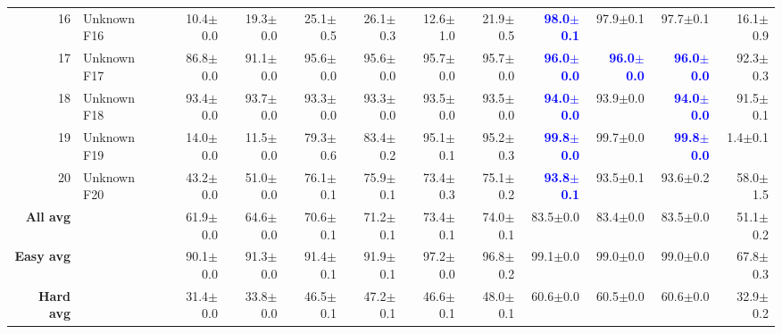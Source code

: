\begin{table}[t]
\begin{tabular}{r l  r r r r r r r r r r}
\rowcolor{gray!15}16 & Unknown F16 & 10.4$\pm$0.0 & 19.3$\pm$0.0 & 25.1$\pm$0.5 & 26.1$\pm$0.3 & 12.6$\pm$1.0 & 21.9$\pm$0.5 & \textcolor{blue}{\textbf{98.0$\pm$0.1}} & 97.9$\pm$0.1 & 97.7$\pm$0.1 & 16.1$\pm$0.9 \\
\rowcolor{gray!15}17 & Unknown F17 & 86.8$\pm$0.0 & 91.1$\pm$0.0 & 95.6$\pm$0.0 & 95.6$\pm$0.0 & 95.7$\pm$0.0 & 95.7$\pm$0.0 & \textcolor{blue}{\textbf{96.0$\pm$0.0}} & \textcolor{blue}{\textbf{96.0$\pm$0.0}} & \textcolor{blue}{\textbf{96.0$\pm$0.0}} & 92.3$\pm$0.3 \\
\rowcolor{gray!15}18 & Unknown F18 & 93.4$\pm$0.0 & 93.7$\pm$0.0 & 93.3$\pm$0.0 & 93.3$\pm$0.0 & 93.5$\pm$0.0 & 93.5$\pm$0.0 & \textcolor{blue}{\textbf{94.0$\pm$0.0}} & 93.9$\pm$0.0 & \textcolor{blue}{\textbf{94.0$\pm$0.0}} & 91.5$\pm$0.1 \\
\rowcolor{gray!15}19 & Unknown F19 & 14.0$\pm$0.0 & 11.5$\pm$0.0 & 79.3$\pm$0.6 & 83.4$\pm$0.2 & 95.1$\pm$0.1 & 95.2$\pm$0.3 & \textcolor{blue}{\textbf{99.8$\pm$0.0}} & 99.7$\pm$0.0 & \textcolor{blue}{\textbf{99.8$\pm$0.0}} & 1.4$\pm$0.1 \\
\rowcolor{gray!15}20 & Unknown F20 & 43.2$\pm$0.0 & 51.0$\pm$0.0 & 76.1$\pm$0.1 & 75.9$\pm$0.1 & 73.4$\pm$0.3 & 75.1$\pm$0.2 & \textcolor{blue}{\textbf{93.8$\pm$0.1}} & 93.5$\pm$0.1 & 93.6$\pm$0.2 & 58.0$\pm$1.5 \\
\midrule
\textbf{All avg} & & 61.9$\pm$0.0 & 64.6$\pm$0.0 & 70.6$\pm$0.1 & 71.2$\pm$0.1 & 73.4$\pm$0.1 & 74.0$\pm$0.1 & 83.5$\pm$0.0 & 83.4$\pm$0.0 & 83.5$\pm$0.0 & 51.1$\pm$0.2 \\
\textbf{Easy avg} & & 90.1$\pm$0.0 & 91.3$\pm$0.0 & 91.4$\pm$0.1 & 91.9$\pm$0.1 & 97.2$\pm$0.0 & 96.8$\pm$0.2 & 99.1$\pm$0.0 & 99.0$\pm$0.0 & 99.0$\pm$0.0 & 67.8$\pm$0.3 \\
\textbf{Hard avg} & & 31.4$\pm$0.0 & 33.8$\pm$0.0 & 46.5$\pm$0.1 & 47.2$\pm$0.1 & 46.6$\pm$0.1 & 48.0$\pm$0.1 & 60.6$\pm$0.0 & 60.5$\pm$0.0 & 60.6$\pm$0.0 & 32.9$\pm$0.2 \\
\bottomrule
\end{tabular}
\end{table}